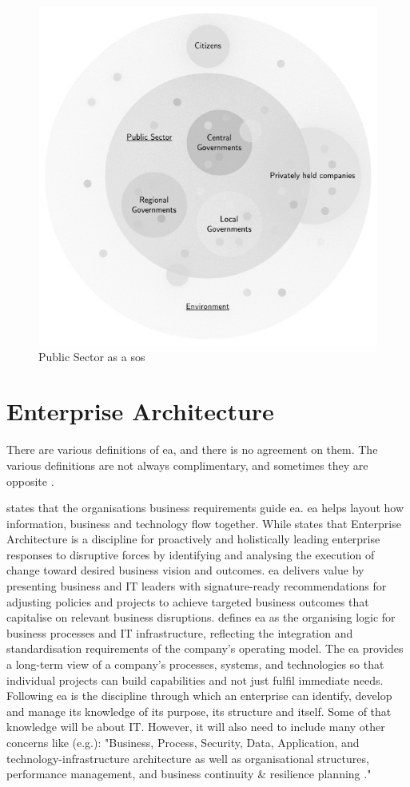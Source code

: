\begin{figure}[H]
	\centering
	\includegraphics[width=0.5\linewidth]{images/pssystemofsystems}
	\caption[Public Sector as a \acrlong{sos}]{Public Sector as a \acrlong{sos}}
	\label{fig:pssystemofsystems}
\end{figure}


\section{Enterprise Architecture}
\label{sec:tbenterprisearchitecture}
There are various definitions of \acrlong{ea}, and there is no agreement on them. The various definitions are not always complimentary, and sometimes they are opposite \parencites{Lapalme2012}{SaintLouis2019}{Hoogervorst2009}. 

\textcite{White2018} states that the organisations business requirements guide \acrshort{ea}. \acrshort{ea} helps layout how information, business and technology flow together. While \textcite{Gartner} states that Enterprise Architecture is a discipline for proactively and holistically leading enterprise responses to disruptive forces by identifying and analysing the execution of change toward desired business vision and outcomes. \acrshort{ea} delivers value by presenting business and IT leaders with signature-ready recommendations for adjusting policies and projects to achieve targeted business outcomes that capitalise on relevant business disruptions. \textcite[p.~9]{Ross2014} defines \acrshort{ea} as the organising logic for business processes and IT infrastructure, reflecting the integration and standardisation requirements of the company's operating model. The \acrshort{ea} provides a long-term view of a company's processes, systems, and technologies so that individual projects can build capabilities and not just fulfil immediate needs. Following \textcite[p.~4]{Graves2009} \acrshort{ea} is the discipline through which an enterprise can identify, develop and manage its knowledge of its purpose, its structure and itself. Some of that knowledge will be about IT. However, it will also need to include many other concerns like (e.g.): "Business, Process, Security, Data, Application, and technology-infrastructure architecture as well as organisational structures, performance management, and  business continuity \& resilience planning \parencite[p.~4]{Graves2009}."

